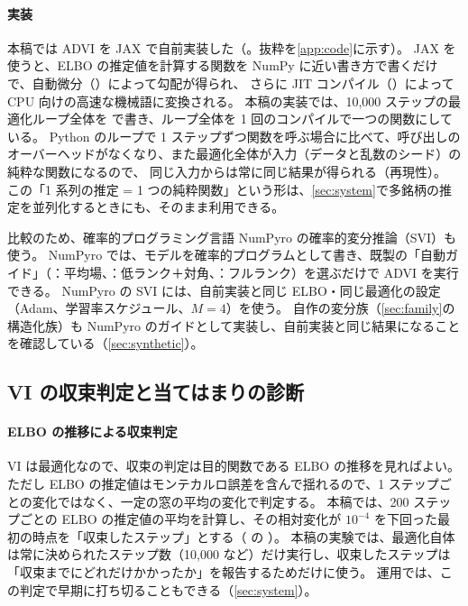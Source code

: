 \paragraph{実装}
本稿では ADVI を JAX \parencite{bradbury2018} で自前実装した（。抜粋を\cref{app:code}に示す）。
JAX を使うと、ELBO の推定値を計算する関数を NumPy に近い書き方で書くだけで、自動微分（）によって勾配が得られ、
さらに JIT コンパイル（）によって CPU 向けの高速な機械語に変換される。
本稿の実装では、10,000 ステップの最適化ループ全体を  で書き、ループ全体を 1 回のコンパイルで一つの関数にしている。
Python のループで 1 ステップずつ関数を呼ぶ場合に比べて、呼び出しのオーバーヘッドがなくなり、また最適化全体が入力（データと乱数のシード）の純粋な関数になるので、
同じ入力からは常に同じ結果が得られる（再現性）。
この「1 系列の推定 = 1 つの純粋関数」という形は、\cref{sec:system}で多銘柄の推定を並列化するときにも、そのまま利用できる。

比較のため、確率的プログラミング言語 NumPyro の確率的変分推論（SVI）も使う。
NumPyro では、モデルを確率的プログラムとして書き、既製の「自動ガイド」（：平均場、：低ランク＋対角、：フルランク）を選ぶだけで ADVI を実行できる。
NumPyro の SVI には、自前実装と同じ ELBO・同じ最適化の設定（Adam、学習率スケジュール、$M = 4$）を使う。
自作の変分族（\cref{sec:family}の構造化族）も NumPyro のガイドとして実装し、自前実装と同じ結果になることを確認している（\cref{sec:synthetic}）。

\subsection{VI の収束判定と当てはまりの診断}\label{sec:inf-diagnostics}

\paragraph{ELBO の推移による収束判定}
VI は最適化なので、収束の判定は目的関数である ELBO の推移を見ればよい。
ただし ELBO の推定値はモンテカルロ誤差を含んで揺れるので、1 ステップごとの変化ではなく、一定の窓の平均の変化で判定する。
本稿では、200 ステップごとの ELBO の推定値の平均を計算し、その相対変化が $10^{-4}$ を下回った最初の時点を「収束したステップ」とする（ の ）。
本稿の実験では、最適化自体は常に決められたステップ数（10,000 など）だけ実行し、収束したステップは「収束までにどれだけかかったか」を報告するためだけに使う。
運用では、この判定で早期に打ち切ることもできる（\cref{sec:system}）。

